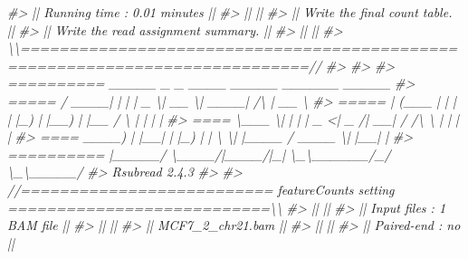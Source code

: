 \documentclass[
]{article}
\newenvironment{Shaded}{\begin{snugshade}}{\end{snugshade}}
\newcommand{\CommentTok}[1]{\textcolor[rgb]{0.56,0.35,0.01}{\textit{#1}}}
\begin{document}
\begin{Shaded}
\begin{Highlighting}[]
\CommentTok{\#\textgreater{} ||    Running time : 0.01 minutes                                             ||}
\CommentTok{\#\textgreater{} ||                                                                            ||}
\CommentTok{\#\textgreater{} || Write the final count table.                                               ||}
\CommentTok{\#\textgreater{} || Write the read assignment summary.                                         ||}
\CommentTok{\#\textgreater{} ||                                                                            ||}
\CommentTok{\#\textgreater{} \textbackslash{}\textbackslash{}============================================================================//}
\CommentTok{\#\textgreater{} }
\CommentTok{\#\textgreater{} }
\CommentTok{\#\textgreater{}         ==========     \_\_\_\_\_ \_    \_ \_\_\_\_  \_\_\_\_\_  \_\_\_\_\_\_          \_\_\_\_\_  }
\CommentTok{\#\textgreater{}         =====         / \_\_\_\_| |  | |  \_ \textbackslash{}|  \_\_ \textbackslash{}|  \_\_\_\_|   /\textbackslash{}   |  \_\_ \textbackslash{} }
\CommentTok{\#\textgreater{}           =====      | (\_\_\_ | |  | | |\_) | |\_\_) | |\_\_     /  \textbackslash{}  | |  | |}
\CommentTok{\#\textgreater{}             ====      \textbackslash{}\_\_\_ \textbackslash{}| |  | |  \_ \textless{}|  \_  /|  \_\_|   / /\textbackslash{} \textbackslash{} | |  | |}
\CommentTok{\#\textgreater{}               ====    \_\_\_\_) | |\_\_| | |\_) | | \textbackslash{} \textbackslash{}| |\_\_\_\_ / \_\_\_\_ \textbackslash{}| |\_\_| |}
\CommentTok{\#\textgreater{}         ==========   |\_\_\_\_\_/ \textbackslash{}\_\_\_\_/|\_\_\_\_/|\_|  \textbackslash{}\_\textbackslash{}\_\_\_\_\_\_/\_/    \textbackslash{}\_\textbackslash{}\_\_\_\_\_/}
\CommentTok{\#\textgreater{}        Rsubread 2.4.3}
\CommentTok{\#\textgreater{} }
\CommentTok{\#\textgreater{} //========================== featureCounts setting ===========================\textbackslash{}\textbackslash{}}
\CommentTok{\#\textgreater{} ||                                                                            ||}
\CommentTok{\#\textgreater{} ||             Input files : 1 BAM file                                       ||}
\CommentTok{\#\textgreater{} ||                                                                            ||}
\CommentTok{\#\textgreater{} ||                           MCF7\_2\_chr21.bam                                 ||}
\CommentTok{\#\textgreater{} ||                                                                            ||}
\CommentTok{\#\textgreater{} ||              Paired{-}end : no                                               ||}

\end{Highlighting}
\end{Shaded}
\end{document}
